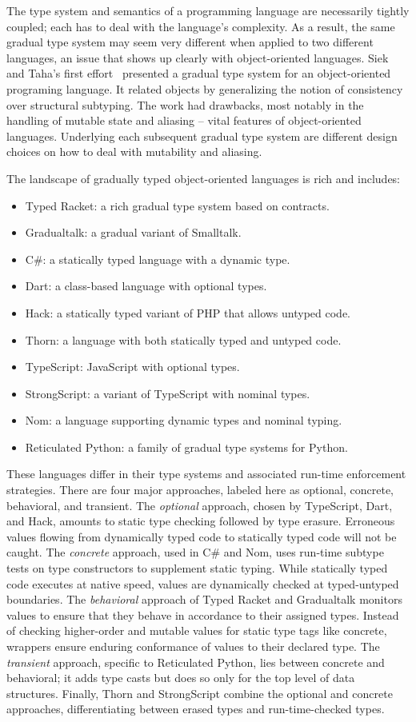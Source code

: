 \documentclass[a4paper,USenglish]{lipics-v2018}
\newcounter{lem}
\begin{document}
The type system and semantics of a programming language are necessarily
tightly coupled; each has to deal with the language's complexity. As a
result, the same gradual type system may seem very different when applied to
two different languages, an issue that shows up clearly with object-oriented
languages. Siek and Taha's first effort~\cite{SiekTaha07} presented a
gradual type system for an object-oriented programing language. It related objects by generalizing
the notion of consistency~\cite{SiekTaha06} over structural subtyping. The
work had drawbacks, most notably in the handling of mutable state and
aliasing -- vital features of object-oriented languages. Underlying each
subsequent gradual type system are different design choices on how to deal
with mutability and aliasing.

The landscape of gradually typed object-oriented languages is rich and includes:\medskip
\begin{itemize}
\item Typed Racket: a rich gradual type system based on contracts.
\item Gradualtalk: a gradual variant of Smalltalk.
\item C\#: a statically typed language with a dynamic type.
\item Dart: a class-based language with optional types.
\item Hack: a statically typed variant of PHP that allows untyped code.
\item Thorn: a language with both statically typed and untyped code.
\item TypeScript: JavaScript with optional types.
\item StrongScript: a variant of TypeScript with nominal types.
\item Nom: a language supporting dynamic types and nominal typing.
\item Reticulated Python: a family of gradual type systems for Python.
\end{itemize}
\medskip These languages differ in their type systems and associated
run-time enforcement strategies. There are four major approaches, labeled here
as optional, concrete, behavioral, and transient. The \emph{optional}
approach, chosen by TypeScript, Dart, and Hack, amounts to static
type checking followed by type erasure. Erroneous values flowing from
dynamically typed code to statically typed code will not be caught. The
\emph{concrete} approach, used in C\# and Nom, uses run-time subtype tests
on type constructors to supplement static typing. While statically typed
code executes at native speed, values are dynamically checked at
typed-untyped boundaries. The \emph{behavioral} approach of Typed Racket and
Gradualtalk monitors values to ensure that they behave in accordance to
their assigned types. Instead of checking higher-order and mutable values
for static type tags like concrete, wrappers ensure enduring conformance of
values to their declared type. The \emph{transient} approach, specific to
Reticulated Python, lies between concrete and behavioral; it adds type casts
but does so only for the top level of data structures. Finally, Thorn and
StrongScript combine the optional and concrete approaches, differentiating
between erased types and run-time-checked types.
\end{document}

